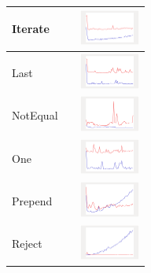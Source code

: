 \begin{longtable}{ m{2.5cm} m{8cm} m{2cm} }
Iterate &

&
\includegraphics[width=2cm]{../graphs/orderedset/small/Iterate}
\\\hline

Last &

&
\includegraphics[width=2cm]{../graphs/orderedset/small/Last}
\\\hline

NotEqual &

&
\includegraphics[width=2cm]{../graphs/orderedset/small/NEQ}
\\\hline

One &

&
\includegraphics[width=2cm]{../graphs/orderedset/small/One}
\\\hline

Prepend &

&
\includegraphics[width=2cm]{../graphs/orderedset/small/Prepend}
\\\hline

Reject &

&
\includegraphics[width=2cm]{../graphs/orderedset/small/Reject}
\\\hline


\end{longtable}
